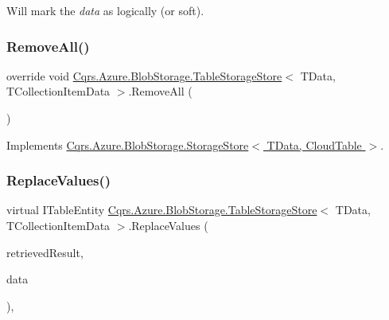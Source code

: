 Will mark the {\itshape data}  as logically (or soft). 

\mbox{\label{classCqrs_1_1Azure_1_1BlobStorage_1_1TableStorageStore_aadd66b35bfa105ef4446bd791e99a3d5}} 
\subsubsection{\texorpdfstring{Remove\+All()}{RemoveAll()}}
{\footnotesize\ttfamily override void \hyperlink{classCqrs_1_1Azure_1_1BlobStorage_1_1TableStorageStore}{Cqrs.\+Azure.\+Blob\+Storage.\+Table\+Storage\+Store}$<$ T\+Data, T\+Collection\+Item\+Data $>$.Remove\+All (\begin{DoxyParamCaption}{ }\end{DoxyParamCaption})\hspace{0.3cm}{\ttfamily [virtual]}}



Implements \hyperlink{classCqrs_1_1Azure_1_1BlobStorage_1_1StorageStore_a4e848f342be903293812b3b660464d1a}{Cqrs.\+Azure.\+Blob\+Storage.\+Storage\+Store$<$ T\+Data, Cloud\+Table $>$}.

\mbox{\label{classCqrs_1_1Azure_1_1BlobStorage_1_1TableStorageStore_adc625eceee6e2b190997a771740e01b9}} 
\subsubsection{\texorpdfstring{Replace\+Values()}{ReplaceValues()}}
{\footnotesize\ttfamily virtual I\+Table\+Entity \hyperlink{classCqrs_1_1Azure_1_1BlobStorage_1_1TableStorageStore}{Cqrs.\+Azure.\+Blob\+Storage.\+Table\+Storage\+Store}$<$ T\+Data, T\+Collection\+Item\+Data $>$.Replace\+Values (\begin{DoxyParamCaption}\item[{Table\+Result}]{retrieved\+Result,  }\item[{T\+Data}]{data }\end{DoxyParamCaption})\hspace{0.3cm}{\ttfamily [protected]}, {\ttfamily [virtual]}}

